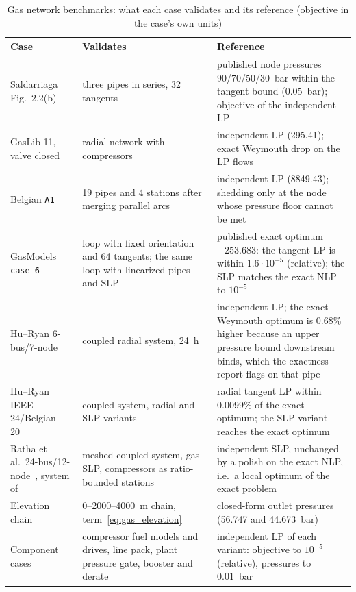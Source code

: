 \begin{table}[t]
  \centering
  \caption{Gas network benchmarks: what each case validates and its
    reference (objective in the case's own units)}
  \label{tab:gas_bench}
  \small
  \begin{tabular}{@{}p{3.3cm}p{6.2cm}p{6.6cm}@{}}
    \toprule
    \textbf{Case} & \textbf{Validates} & \textbf{Reference} \\
    \midrule
    Saldarriaga Fig.~2.2(b)~\cite{saldarriaga2018phd}
      & three pipes in series, 32 tangents
      & published node pressures 90/70/50/30~bar within the tangent
        bound (0.05~bar); objective of the independent LP \\
    GasLib-11, valve closed~\cite{schmidt2017gaslib}
      & radial network with compressors
      & independent LP (295.41); exact Weymouth drop on the LP flows \\
    Belgian \texttt{A1}~\cite{dewolf2000gas, gasmodels}
      & 19 pipes and 4 stations after merging parallel arcs
      & independent LP (8849.43); shedding only at the node whose
        pressure floor cannot be met \\
    GasModels \texttt{case-6}~\cite{gasmodels}
      & loop with fixed orientation and 64 tangents; the same loop with
        linearized pipes and SLP
      & published exact optimum $-253.683$: the tangent LP is within
        $1.6\cdot10^{-5}$ (relative); the SLP matches the exact NLP to
        $10^{-5}$ \\
    Hu--Ryan 6-bus/7-node~\cite{hu2019data}
      & coupled radial system, 24~h
      & independent LP; the exact Weymouth optimum is 0.68\% higher
        because an upper pressure bound downstream binds, which the
        exactness report flags on that pipe \\
    Hu--Ryan IEEE-24/Belgian-20~\cite{hu2019data}
      & coupled system, radial and SLP variants
      & radial tangent LP within 0.0099\% of the exact optimum; the SLP
        variant reaches the exact optimum \\
    Ratha et al.\ 24-bus/12-node~\cite{ratha2020data}, system
      of~\cite{ordoudis2019gas, ordoudis2018data}
      & meshed coupled system, gas SLP, compressors as ratio-bounded
        stations
      & independent SLP, unchanged by a polish on the exact NLP, i.e.\
        a local optimum of the exact problem \\
    Elevation chain
      & 0--2000--4000~m chain, term~\eqref{eq:gas_elevation}
      & closed-form outlet pressures (56.747 and 44.673~bar) \\
    Component cases
      & compressor fuel models and drives, line pack, plant pressure
        gate, booster and derate
      & independent LP of each variant: objective to $10^{-5}$
        (relative), pressures to 0.01~bar \\
    \bottomrule
  \end{tabular}
\end{table}

